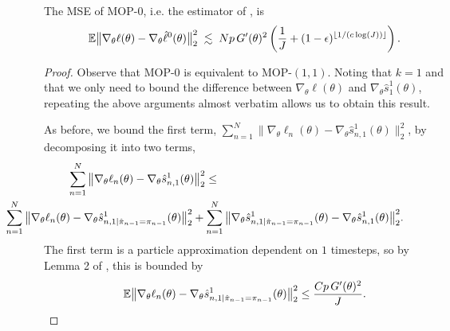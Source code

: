 \begin{cor}
    The MSE of MOP-$0$, i.e. the estimator of \cite{naesseth18}, is
    \begin{equation}
        \mathbb{E}\big\|\nabla_\theta\ell(\theta) - \nabla_\theta \hat\ell^0(\theta)\big\|_2^2 \; \lesssim 
        \; Np \, G'(\theta)^2\left(\frac{1}{J}+(1-\epsilon)^{\lfloor 1/(c\log(J)) \rfloor}\right).
    \end{equation}
\end{cor}
\begin{proof}
    Observe that MOP-$0$ is equivalent to MOP-$(1,1)$. Noting that $k=1$ and that we only need to bound the difference between $\nabla_\theta \ell(\theta)$ and $\nabla_\theta \hat s_1^1(\theta)$, repeating the above arguments almost verbatim allows us to obtain this result. 

    
As before, we bound the first term, $\sum_{n=1}^N\|\nabla_\theta\ell_n(\theta) - \nabla_\theta\hat s_{n,1}^1(\theta)\|_2^2$, by decomposing it into two terms, 
\begin{eqnarray} \nonumber
\hspace{-5mm} \sum_{n=1}^N\big\|\nabla_\theta\ell_n(\theta) - \nabla_\theta\hat s_{n,1}^1(\theta)\big\|_2^2 &\leq 
\\ &&\hspace{-70mm} 
\sum_{n=1}^N \big\|\nabla_\theta\ell_n(\theta) - \nabla_\theta\hat s_{n,1|\hat\pi_{n-1}=\pi_{n-1}}^1(\theta)\big\|_2^2 + \sum_{n=1}^N \big\|\nabla_\theta\hat s_{n,1|\hat\pi_{n-1}=\pi_{n-1}}^1(\theta) - \nabla_\theta\hat s_{n,1}^1(\theta)\big\|_2^2.
\end{eqnarray}
The first term is a particle approximation dependent on $1$ timesteps, so by Lemma 2 of \cite{karjalainen23}, this is bounded by
\begin{equation}\mathbb{E}\big\|\nabla_\theta\ell_n(\theta) - \nabla_\theta\hat s_{n,1|\hat\pi_{n-1}=\pi_{n-1}}^1(\theta)\big\|_2^2 \leq \frac{Cp \, G'(\theta)^2}{J}.\end{equation}


\end{proof}
